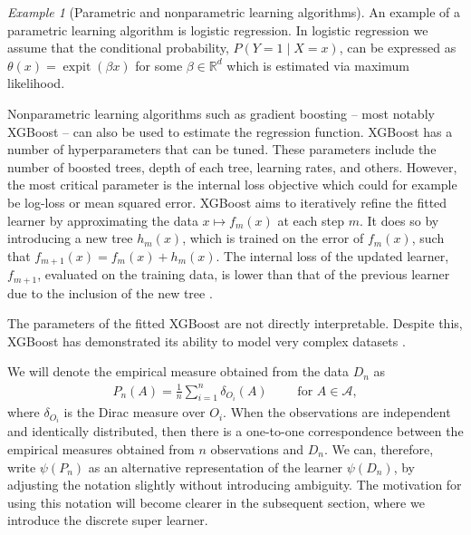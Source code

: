 \documentclass[11pt, a4paper]{article}
\theoremstyle{definition}
\theoremstyle{remark}
\newtheorem{example}{Example}
\newcommand{\btheta}{\theta}
\newcommand{\la}{\psi}
\DeclareMathOperator{\expit}{expit}
\begin{document}
\begin{example}[Parametric and nonparametric learning algorithms]
    An example of a parametric learning algorithm is logistic regression. In logistic regression we assume that the conditional probability, $ P(Y = 1 \mid X = x) $, can be expressed as $ \btheta(x) = \expit( \beta x) $ for some $ \beta \in \mathbb{R}^{d} $ which is estimated via maximum likelihood.   

Nonparametric learning algorithms such as gradient boosting -- most notably XGBoost -- can also be used to estimate the regression function. XGBoost has a number of hyperparameters that can be tuned. These parameters include the number of boosted trees, depth of each tree, learning rates, and others. However, the most critical parameter is the internal loss objective which could for example be log-loss or mean squared error. XGBoost aims to iteratively refine the fitted learner by approximating the data $x \mapsto f_m(x)$ at each step $m$. It does so by introducing a new tree $h_m(x)$, which is trained on the error of $ f_m(x)$, such that $f_{m + 1}(x) = f_m(x) + h_m(x)$. The internal loss of the updated learner, $f_{m + 1}$, evaluated on the training data, is lower than that of the previous learner due to the inclusion of the new tree \parencite{chen2016xgboost}.

The parameters of the fitted XGBoost are not directly interpretable. Despite this, XGBoost has demonstrated its ability to model very complex datasets \parencite{chen2016xgboost}.

\end{example}
We will denote the empirical measure obtained from the data $ D_n $ as
\begin{align*}
    P_n(A) = \frac{1}{n} \sum_{i = 1}^{n} \delta_{O_i}(A)\qquad \text{ for } A \in \mathcal{A},
\end{align*}
where $ \delta_{O_i} $ is the Dirac measure over $ O_i $. When the observations are independent and identically distributed, then there is a one-to-one correspondence between the empirical measures obtained from $ n $ observations and $ D_n $. We can, therefore, write $ \la(P_n)$ as an alternative representation of the learner $\la(D_n)$, by adjusting the notation slightly without introducing ambiguity. The motivation for using this notation will become clearer in the subsequent section, where we introduce the discrete super learner.
\end{document}
